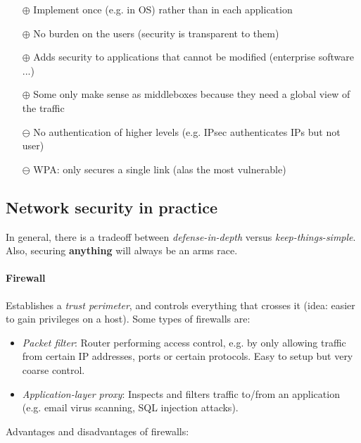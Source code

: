 \begin{itemize}
    \item[$\oplus$] Implement once (e.g. in OS) rather than in each application
    \item[$\oplus$] No burden on the users (security is transparent to them)
    \item[$\oplus$] Adds security to applications that cannot be modified (enterprise software ...)
    \item[$\oplus$] Some only make sense as middleboxes because they need a global view of the traffic
    
    \item[$\ominus$] No authentication of higher levels (e.g. IPsec authenticates IPs but not user)
    \item[$\ominus$] WPA: only secures a single link (alas the most vulnerable)
\end{itemize}

\subsection{Network security in practice}

In general, there is a tradeoff between \emph{defense-in-depth} versus \emph{keep-things-simple}. Also, securing \textbf{anything} will always be an arms race.

\paragraph{Firewall} Establishes a \emph{trust perimeter}, and controls everything that crosses it (idea: easier to gain privileges on a host). Some types of firewalls are:
\begin{itemize}
    \item \emph{Packet filter}: Router performing access control, e.g. by only allowing traffic from certain IP addresses, ports or certain protocols. Easy to setup but very coarse control.
    \item \emph{Application-layer proxy}: Inspects and filters traffic to/from an application (e.g. email virus scanning, SQL injection attacks).
\end{itemize}

Advantages and disadvantages of firewalls:

